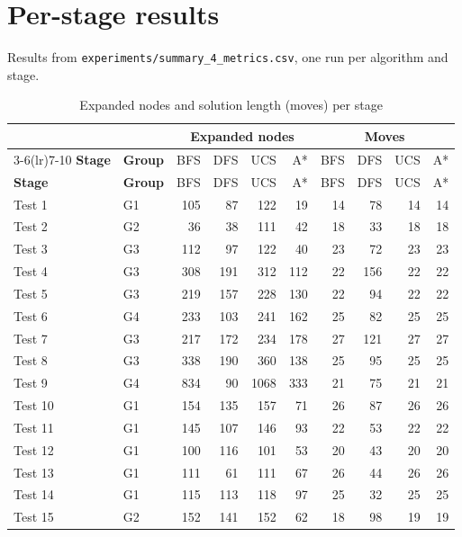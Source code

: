 \section{Per-stage results}
\label{app:perlevel}

Results from \texttt{experiments/summary\_4\_metrics.csv}, one run per algorithm and stage.

\begingroup
\renewcommand{\baselinestretch}{1.0}\small
\begin{longtable}{llrrrrrrrr}
\caption{Expanded nodes and solution length (moves) per stage}\label{tab:perlevel-exp}\\
\toprule
 & & \multicolumn{4}{c}{\textbf{Expanded nodes}} & \multicolumn{4}{c}{\textbf{Moves}} \\
\cmidrule(lr){3-6}\cmidrule(lr){7-10}
\textbf{Stage} & \textbf{Group} & BFS & DFS & UCS & A* & BFS & DFS & UCS & A* \\
\midrule
\endfirsthead
\toprule
\textbf{Stage} & \textbf{Group} & BFS & DFS & UCS & A* & BFS & DFS & UCS & A* \\
\midrule
\endhead
\bottomrule
\endfoot
Test 1 & G1 & 105 & 87 & 122 & 19 & 14 & 78 & 14 & 14 \\
Test 2 & G2 & 36 & 38 & 111 & 42 & 18 & 33 & 18 & 18 \\
Test 3 & G3 & 112 & 97 & 122 & 40 & 23 & 72 & 23 & 23 \\
Test 4 & G3 & 308 & 191 & 312 & 112 & 22 & 156 & 22 & 22 \\
Test 5 & G3 & 219 & 157 & 228 & 130 & 22 & 94 & 22 & 22 \\
Test 6 & G4 & 233 & 103 & 241 & 162 & 25 & 82 & 25 & 25 \\
Test 7 & G3 & 217 & 172 & 234 & 178 & 27 & 121 & 27 & 27 \\
Test 8 & G3 & 338 & 190 & 360 & 138 & 25 & 95 & 25 & 25 \\
Test 9 & G4 & 834 & 90 & 1068 & 333 & 21 & 75 & 21 & 21 \\
Test 10 & G1 & 154 & 135 & 157 & 71 & 26 & 87 & 26 & 26 \\
Test 11 & G1 & 145 & 107 & 146 & 93 & 22 & 53 & 22 & 22 \\
Test 12 & G1 & 100 & 116 & 101 & 53 & 20 & 43 & 20 & 20 \\
Test 13 & G1 & 111 & 61 & 111 & 67 & 26 & 44 & 26 & 26 \\
Test 14 & G1 & 115 & 113 & 118 & 97 & 25 & 32 & 25 & 25 \\
Test 15 & G2 & 152 & 141 & 152 & 62 & 18 & 98 & 19 & 19 \\

\end{longtable}
